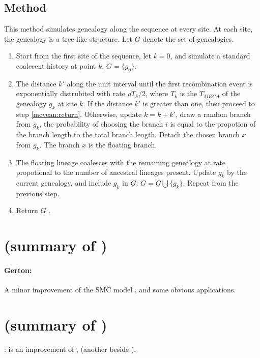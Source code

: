 \subsection{Method}
This method simulates genealogy along the sequence at every site. At each site, the genealogy is a tree-like structure.
Let $G$ denote the set of genealogies.
\begin{enumerate}
\item Start from the first site of the sequence, let $k=0$, and simulate a standard coalecent history at point $k$, $G=\{g_0\}$. 
\item The distance $k'$ along the unit interval until the first recombination event is exponentially distrubited with rate $\rho T_k/2$, where $T_k$ is the $T_{MRCA}$ of the genealogy $g_k$ at site $k$. If the distance $k'$ is greater than one, then proceed to step \ref{mcvean:return}. Otherwise, update $k=k+k'$, draw a random branch from $g_k$, the probability of choosing the branch $i$ is equal to the propotion of the branch length to the total branch length. %
Detach the chosen branch $x$ from $g_k$. The branch $x$ is the floating branch. \label{mcvean:floating}
\item The floating lineage coalesces with the remaining genealogy at rate propotional to the number of ancestral lineages present. Update $g_k$ by the current genealogy, and include $g_k$ in $G$: $G=G\bigcup \{g_k\}$. Repeat from the previous step.
\item Return $G$ \label{mcvean:return}.
\end{enumerate}

\section{(summary of \citet{Eriksson2009})}
{\color{red}\paragraph{Gerton:} A minor improvement of the SMC model \citet{McVean2005}, and some obvious applications.}

\section{(summary of \citet{Marjoram2006})}
{\color{blue}
\citet{Wakeley2008}:
\citet{Marjoram2006} is an improvement of \citet{McVean2005}
}, (another beside \citet{Eriksson2009}).



